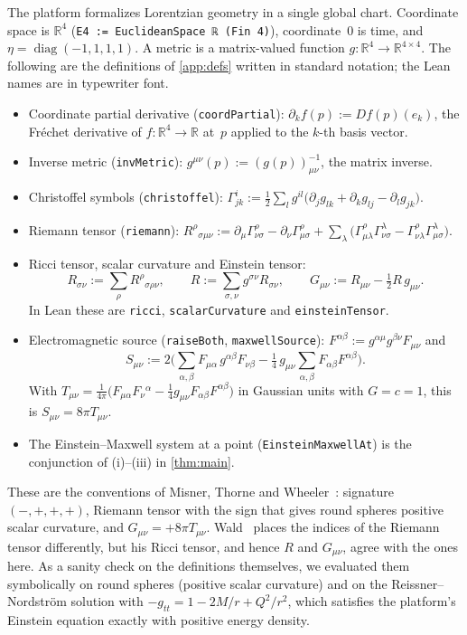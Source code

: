 \documentclass[11pt]{article}
\theoremstyle{definition}
\theoremstyle{remark}
\newcommand{\R}{\mathbb{R}}
\newcommand{\lean}[1]{\lstinline[basicstyle=\ttfamily\normalsize,columns=fullflexible,breaklines=false]{#1}}
\begin{document}
The platform formalizes Lorentzian geometry in a single global chart.
Coordinate space is $\R^4$ (\lean{E4 := EuclideanSpace ℝ (Fin 4)}), coordinate~$0$ is time, and $\eta=\operatorname{diag}(-1,1,1,1)$.
A metric is a matrix-valued function $g:\R^4\to\R^{4\times 4}$.
The following are the definitions of \cref{app:defs} written in standard notation; the Lean names are in typewriter font.
\begin{itemize}
  \item Coordinate partial derivative (\lean{coordPartial}): $\partial_k f(p) := Df(p)(e_k)$, the Fr\'echet derivative of $f:\R^4\to\R$ at~$p$ applied to the $k$-th basis vector.
  \item Inverse metric (\lean{invMetric}): $g^{\mu\nu}(p) := (g(p))^{-1}_{\mu\nu}$, the matrix inverse.
  \item Christoffel symbols (\lean{christoffel}): $\Gamma^i_{jk} := \tfrac12\sum_l g^{il}\big(\partial_j g_{lk}+\partial_k g_{lj}-\partial_l g_{jk}\big)$.
  \item Riemann tensor (\lean{riemann}): $R^\rho{}_{\sigma\mu\nu} := \partial_\mu\Gamma^\rho_{\nu\sigma}-\partial_\nu\Gamma^\rho_{\mu\sigma}+\sum_\lambda\big(\Gamma^\rho_{\mu\lambda}\Gamma^\lambda_{\nu\sigma}-\Gamma^\rho_{\nu\lambda}\Gamma^\lambda_{\mu\sigma}\big)$.
  \item Ricci tensor, scalar curvature and Einstein tensor:
  \[ R_{\sigma\nu}:=\sum_\rho R^\rho{}_{\sigma\rho\nu},\qquad R:=\sum_{\sigma,\nu}g^{\sigma\nu}R_{\sigma\nu},\qquad G_{\mu\nu}:=R_{\mu\nu}-\tfrac12 R\,g_{\mu\nu}. \]
  In Lean these are \lean{ricci}, \lean{scalarCurvature} and \lean{einsteinTensor}.
  \item Electromagnetic source (\lean{raiseBoth}, \lean{maxwellSource}): $F^{\alpha\beta}:=g^{\alpha\mu}g^{\beta\nu}F_{\mu\nu}$ and
  \[
    S_{\mu\nu} := 2\Big(\sum_{\alpha,\beta}F_{\mu\alpha}\,g^{\alpha\beta}F_{\nu\beta}-\tfrac14\,g_{\mu\nu}\sum_{\alpha,\beta}F_{\alpha\beta}F^{\alpha\beta}\Big).
  \]
  With $T_{\mu\nu}=\frac1{4\pi}\big(F_{\mu\alpha}F_\nu{}^\alpha-\frac14 g_{\mu\nu}F_{\alpha\beta}F^{\alpha\beta}\big)$ in Gaussian units with $G=c=1$, this is $S_{\mu\nu}=8\pi T_{\mu\nu}$.
  \item The Einstein--Maxwell system at a point (\lean{EinsteinMaxwellAt}) is the conjunction of (i)--(iii) in \cref{thm:main}.
\end{itemize}
These are the conventions of Misner, Thorne and Wheeler~\cite{mtw1973}: signature $(-,+,+,+)$, Riemann tensor with the sign that gives round spheres positive scalar curvature, and $G_{\mu\nu}=+8\pi T_{\mu\nu}$. Wald~\cite{wald1984} places the indices of the Riemann tensor differently, but his Ricci tensor, and hence $R$ and $G_{\mu\nu}$, agree with the ones here. As a sanity check on the definitions themselves, we evaluated them symbolically on round spheres (positive scalar curvature) and on the Reissner--Nordstr\"om solution with $-g_{tt}=1-2M/r+Q^2/r^2$, which satisfies the platform's Einstein equation exactly with positive energy density.
\end{document}
